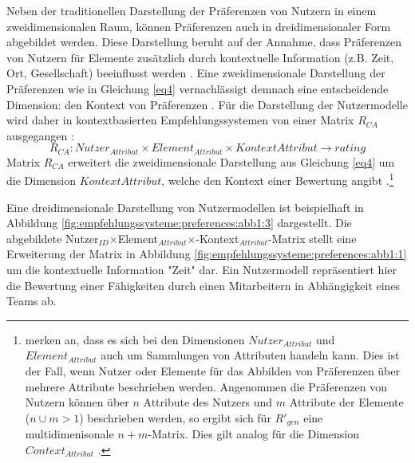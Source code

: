 Neben der traditionellen Darstellung der Präferenzen von Nutzern in einem zweidimensionalen Raum, können Präferenzen auch in dreidimensionaler Form abgebildet werden.
Diese Darstellung beruht auf der Annahme, dass Präferenzen von Nutzern für Elemente zusätzlich durch kontextuelle Information (z.B. Zeit, Ort, Gesellschaft) beeinflusst werden \cite[S. 195]{ricci:book}.
Eine zweidimensionale Darstellung der Präferenzen wie in Gleichung \ref{eq4} vernachlässigt demnach eine entscheidende Dimension: den Kontext von Präferenzen \cite[S. 253]{berkovsky:article}.
Für die Darstellung der Nutzermodelle wird daher in kontextbasierten Empfehlungssystemen von einer Matrix $R_{CA}$ ausgegangen \cite[S. 254]{berkovsky:article}:
\begin{equation}\label{eq9}
    R_{CA}: Nutzer_{Attribut} \times Element_{Attribut} \times Kontext{Attribut} \rightarrow rating
\end{equation}
Matrix $R_{CA}$ erweitert die zweidimensionale Darstellung aus Gleichung \ref{eq4} um die Dimension $Kontext{Attribut}$, welche den Kontext einer Bewertung angibt \cite[S. 254]{berkovsky:article}.\footnote{\textcite[S. 249ff]{berkovsky:article} merken an, dass es sich bei den Dimensionen $Nutzer_{Attribut}$ und $Element_{Attribut}$ auch um Sammlungen von Attributen handeln kann. Dies ist der Fall, wenn Nutzer oder Elemente für das Abbilden von Präferenzen über mehrere Attribute beschrieben werden. Angenommen die Präferenzen von Nutzern können über $n$ Attribute des Nutzers und $m$ Attribute der Elemente ($n \cup m > 1$) beschrieben werden, so ergibt sich für $R'_{gen}$ eine multidimenisonale $n+m$-Matrix. Dies gilt analog für die Dimension $Context_{Attribut}$ \cite[S. 254f]{berkovsky:article}.}

Eine dreidimensionale Darstellung von Nutzermodellen ist beispielhaft in Abbildung \ref{fig:empfehlungssysteme:preferences:abb1:3} dargestellt.
Die abgebildete Nutzer$_{ID}$$\times$Element$_{Attribut}$$\times$-Kontext$_{Attribut}$-Matrix stellt eine Erweiterung der Matrix in Abbildung \ref{fig:empfehlungssysteme:preferences:abb1:1} um die kontextuelle Information "Zeit" dar.
Ein Nutzermodell repräsentiert hier die Bewertung einer Fähigkeiten durch einen Mitarbeitern in Abhängigkeit eines Teams ab.

